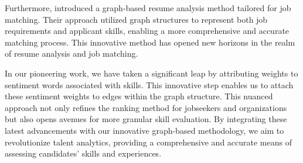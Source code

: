 Furthermore, \cite{wang2022graph} introduced a graph-based resume analysis method tailored for job matching. Their approach utilized graph structures to represent both job requirements and applicant skills, enabling a more comprehensive and accurate matching process. This innovative method has opened new horizons in the realm of resume analysis and job matching.

In our pioneering work, we have taken a significant leap by attributing weights to sentiment words associated with skills. This innovative step enables us to attach these sentiment weights to edges within the graph structure. This nuanced approach not only refines the ranking method for jobseekers and organizations but also opens avenues for more granular skill evaluation. By integrating these latest advancements with our innovative graph-based methodology, we aim to revolutionize talent analytics, providing a comprehensive and accurate means of assessing candidates' skills and experiences.